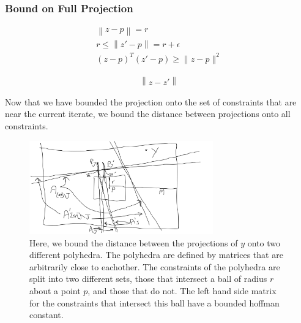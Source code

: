 \documentclass{article}
\theoremstyle{case}
\numberwithin{theorem}{subsection}
\newcommand{\activeindicesk}{{ \mathbb I_h^{(k)} }}
\newcommand{\minactivealpha}{{ \alpha_{\textrm{h}} }}
\newcommand{\activedirk}{{ u_{h}^{(k)} }}
\newcommand{\activegradmin}{{ g_{\textrm{h}} }}
\begin{document}
\subsubsection{Bound on Full Projection}


\begin{align*}
\left\|z - p\right\| = r \\
r \le \left\|z' - p\right\| = r + \epsilon \\
(z - p)^T (z' - p) \ge \|z - p\|^2
\end{align*}

\begin{align*}
\left\|z - z'\right\|
\end{align*}



Now that we have bounded the projection onto the set of constraints that are near the current iterate, we bound the distance between projections onto all constraints.


\newpage
\begin{figure}[ht]
    \centering
    \includegraphics[width=300px]{images/complicated_lemma.png}
    \caption{
    	Here, we bound the distance between the projections of $y$ onto two different polyhedra.
    	The polyhedra are defined by matrices that are arbitrarily close to eachother.
    	The constraints of the polyhedra are split into two different sets, those that intersect a ball of radius $r$ about a point $p$,
    	and those that do not.
    	The left hand side matrix for the constraints that intersect this ball have a bounded hoffman constant.
	}
    \label{complicated_lemma}
\end{figure}
\newpage
\end{document}
